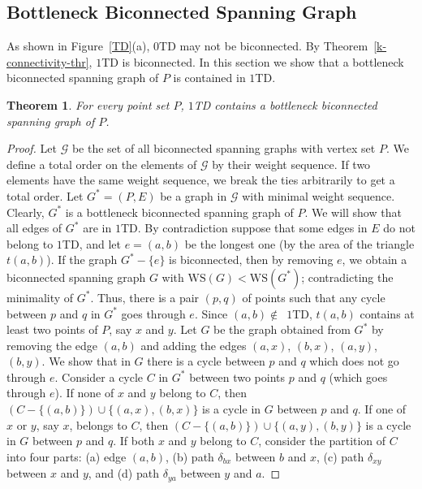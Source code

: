 \documentclass[11pt,a4paper]{article}
\newcommand{\kTD}[2]{$#1$\text{-}TD#2}
\newcommand{\WS}[1]{\text{WS$(#1)$}}
\newtheorem{theorem}{Theorem}
\begin{document}
\subsection{Bottleneck Biconnected Spanning Graph}
As shown in Figure~\ref{TD}(a), \kTD{0}{} may not be biconnected. By Theorem~\ref{k-connectivity-thr}, \kTD{1}{} is biconnected. In this section we show that a bottleneck biconnected spanning graph of $P$ is contained in \kTD{1}{}. 

\begin{theorem}
\label{biconnectivity-thr}
 For every point set $P$, \kTD{1}{} contains a bottleneck biconnected spanning graph of $P$.
\end{theorem}

\begin{proof}                                                                                       
Let $\mathcal{G}$ be the set of all biconnected spanning graphs with vertex set $P$. We define a total order on the elements of $\mathcal{G}$ by their weight sequence. If two elements have the same weight sequence, we break the ties arbitrarily to get a total order.
Let $G^* = (P, E)$ be a graph in $\mathcal{G}$ with minimal weight sequence. Clearly, $G^*$ is a bottleneck biconnected spanning graph of $P$. We will show that all edges of $G^*$ are in \kTD{1}{}. By contradiction suppose that some edges in $E$ do not belong to \kTD{1}{}, and let $e = (a, b)$ be the longest one (by the area of the triangle $t(a,b)$). If the graph $G^*-\{e\}$ is biconnected, then by removing $e$, we obtain a biconnected spanning graph $G$ with $\WS{G}<\WS{G^*}$; contradicting the minimality of $G^*$. Thus, there is a pair $(p,q)$ of points such that any cycle between $p$ and $q$ in $G^*$ goes through $e$. Since $(a,b)\notin$~\kTD{1}{}, $t(a,b)$ contains at least two points of $P$, say $x$ and $y$. Let $G$ be the graph obtained from $G^*$ by removing the edge $(a,b)$ and adding the edges $(a,x)$, $(b,x)$, $(a,y)$, $(b,y)$. We show that in $G$ there is a cycle between $p$ and $q$ which does not go through $e$. Consider a cycle $C$ in $G^*$ between two points $p$ and $q$ (which goes through $e$). If none of $x$ and $y$ belong to $C$, then $(C-\{(a,b)\})\allowbreak\cup\allowbreak\{(a,x),(b,x)\}$ is a cycle in $G$ between $p$ and $q$. If one of $x$ or $y$, say $x$, belongs to $C$, then $(C-\{(a,b)\})\allowbreak\cup\allowbreak\{(a,y),(b,y)\}$ is a cycle in $G$ between $p$ and $q$. If both $x$ and $y$ belong to $C$, consider the partition of $C$ into four parts: (a) edge $(a,b)$, (b) path $\delta_{bx}$ between $b$ and $x$, (c) path $\delta_{xy}$ between $x$ and $y$, and (d) path $\delta_{ya}$ between $y$ and $a$. 

\end{proof}
\end{document}
